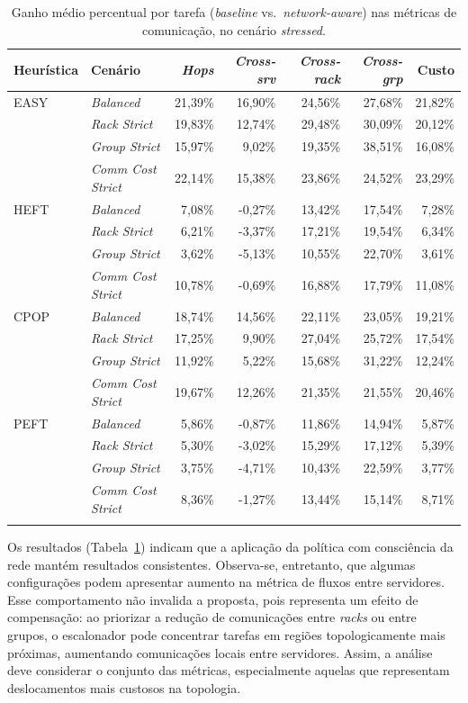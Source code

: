 \documentclass[12pt]{article}
\begin{document}
\begin{table}[h]
\centering
\small
\caption{Ganho médio percentual por tarefa (\textit{baseline} vs.\ \textit{network-aware}) nas métricas de comunicação, no cenário \textit{stressed}.}
\label{tab:significancia_stress}
\begin{tabular}{llrrrrr}
\toprule
Heurística & Cenário & \textit{Hops} & \textit{Cross-srv} & \textit{Cross-rack} & \textit{Cross-grp} & Custo \\
\midrule
EASY & \textit{Balanced} & 21,39\% & 16,90\% & 24,56\% & 27,68\% & 21,82\% \\
 & \textit{Rack Strict} & 19,83\% & 12,74\% & 29,48\% & 30,09\% & 20,12\% \\
 & \textit{Group Strict} & 15,97\% & 9,02\% & 19,35\% & 38,51\% & 16,08\% \\
 & \textit{Comm Cost Strict} & 22,14\% & 15,38\% & 23,86\% & 24,52\% & 23,29\% \\
\addlinespace
HEFT & \textit{Balanced} & 7,08\% & -0,27\% & 13,42\% & 17,54\% & 7,28\% \\
 & \textit{Rack Strict} & 6,21\% & -3,37\% & 17,21\% & 19,54\% & 6,34\% \\
 & \textit{Group Strict} & 3,62\% & -5,13\% & 10,55\% & 22,70\% & 3,61\% \\
 & \textit{Comm Cost Strict} & 10,78\% & -0,69\% & 16,88\% & 17,79\% & 11,08\% \\
\addlinespace
CPOP & \textit{Balanced} & 18,74\% & 14,56\% & 22,11\% & 23,05\% & 19,21\% \\
 & \textit{Rack Strict} & 17,25\% & 9,90\% & 27,04\% & 25,72\% & 17,54\% \\
 & \textit{Group Strict} & 11,92\% & 5,22\% & 15,68\% & 31,22\% & 12,24\% \\
 & \textit{Comm Cost Strict} & 19,67\% & 12,26\% & 21,35\% & 21,55\% & 20,46\% \\
\addlinespace
PEFT & \textit{Balanced} & 5,86\% & -0,87\% & 11,86\% & 14,94\% & 5,87\% \\
 & \textit{Rack Strict} & 5,30\% & -3,02\% & 15,29\% & 17,12\% & 5,39\% \\
 & \textit{Group Strict} & 3,75\% & -4,71\% & 10,43\% & 22,59\% & 3,77\% \\
 & \textit{Comm Cost Strict} & 8,36\% & -1,27\% & 13,44\% & 15,14\% & 8,71\% \\
\addlinespace
\bottomrule
\end{tabular}
\end{table}

Os resultados (Tabela~\ref{tab:significancia_stress}) indicam que a aplicação da política com consciência da rede mantém resultados consistentes.
%
Observa-se, entretanto, que algumas configurações podem apresentar aumento na métrica de fluxos entre servidores. 
%
Esse comportamento não invalida a proposta, pois representa um efeito de compensação: ao priorizar a redução de comunicações entre \textit{racks} ou entre grupos, o escalonador pode concentrar tarefas em regiões topologicamente mais próximas, aumentando comunicações locais entre servidores. 
%
Assim, a análise deve considerar o conjunto das métricas, especialmente aquelas que representam deslocamentos mais custosos na topologia.
\end{document}
